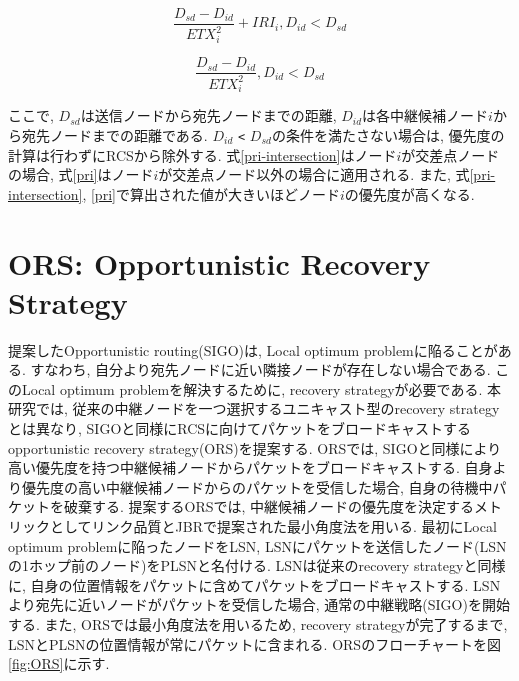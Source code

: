 \documentclass[10pt]{jreport}
\begin{document}
\begin{equation}
	\label{pri-intersection}
	\frac{D_{sd} - D_{id}}{ETX_{i}^{2}} + IRI_i,  D_{id} < D_{sd}
\end{equation}

\begin{equation}
	\label{pri}
	\frac{D_{sd} - D_{id}}{ETX_{i}^{2}} ,   D_{id} < D_{sd}
\end{equation}

ここで, $D_{sd}$は送信ノードから宛先ノードまでの距離, $D_{id}$は各中継候補ノード$i$から宛先ノードまでの距離である. $D_{id}$ \verb|<| $D_{sd}$の条件を満たさない場合は, 優先度の計算は行わずにRCSから除外する. 式\ref{pri-intersection}はノード$i$が交差点ノードの場合, 式\ref{pri}はノード$i$が交差点ノード以外の場合に適用される. また, 式\ref{pri-intersection}, \ref{pri}で算出された値が大きいほどノード$i$の優先度が高くなる.




\section{ORS: Opportunistic Recovery Strategy}
提案したOpportunistic routing(SIGO)は, Local optimum problemに陥ることがある. すなわち, 自分より宛先ノードに近い隣接ノードが存在しない場合である. このLocal optimum problemを解決するために, recovery strategyが必要である. 本研究では, 従来の中継ノードを一つ選択するユニキャスト型のrecovery strategyとは異なり, SIGOと同様にRCSに向けてパケットをブロードキャストするopportunistic recovery strategy(ORS)を提案する. ORSでは, SIGOと同様により高い優先度を持つ中継候補ノードからパケットをブロードキャストする. 自身より優先度の高い中継候補ノードからのパケットを受信した場合, 自身の待機中パケットを破棄する. 提案するORSでは, 中継候補ノードの優先度を決定するメトリックとしてリンク品質とJBRで提案された最小角度法を用いる. 最初にLocal optimum problemに陥ったノードをLSN, LSNにパケットを送信したノード(LSNの1ホップ前のノード)をPLSNと名付ける. LSNは従来のrecovery strategyと同様に, 自身の位置情報をパケットに含めてパケットをブロードキャストする. LSNより宛先に近いノードがパケットを受信した場合, 通常の中継戦略(SIGO)を開始する. また, ORSでは最小角度法を用いるため, recovery strategyが完了するまで, LSNとPLSNの位置情報が常にパケットに含まれる.
ORSのフローチャートを図\ref{fig:ORS}に示す.
\end{document}
